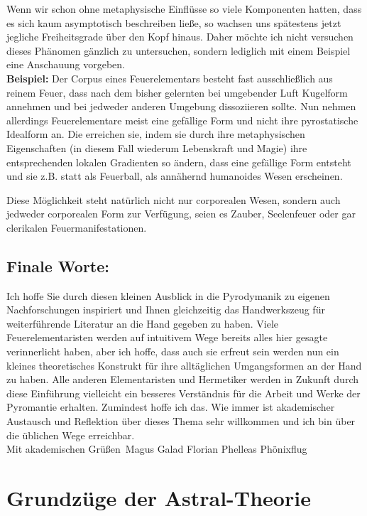 \documentclass[a5paper,8pt]{book}
\begin{document}
Wenn wir schon ohne metaphysische Einflüsse so viele Komponenten hatten, dass es sich kaum asymptotisch beschreiben ließe, 
so wachsen uns spätestens jetzt jegliche Freiheitsgrade über den Kopf hinaus. Daher möchte ich nicht versuchen dieses 
Phänomen gänzlich zu untersuchen, sondern lediglich mit einem Beispiel eine Anschauung vorgeben.\\

\textbf{Beispiel:}
Der Corpus eines Feuerelementars besteht fast ausschließlich aus reinem Feuer, dass nach dem bisher gelernten bei 
umgebender Luft Kugelform annehmen und bei jedweder anderen Umgebung dissoziieren sollte. Nun nehmen allerdings 
Feuerelementare meist eine gefällige Form und nicht ihre pyrostatische Idealform an. Die erreichen sie, indem sie durch 
ihre metaphysischen Eigenschaften (in diesem Fall wiederum Lebenskraft und Magie) ihre entsprechenden lokalen Gradienten 
so ändern, dass eine gefällige Form entsteht und sie z.B. statt als Feuerball, als annähernd humanoides Wesen erscheinen.

Diese Möglichkeit steht natürlich nicht nur corporealen Wesen, sondern auch jedweder corporealen Form zur Verfügung, seien 
es Zauber, Seelenfeuer oder gar clerikalen Feuermanifestationen.

\subsection{Finale Worte:}
Ich hoffe Sie durch diesen kleinen Ausblick in die Pyrodymanik zu eigenen Nachforschungen inspiriert und Ihnen gleichzeitig 
das Handwerkszeug für weiterführende Literatur an die Hand gegeben zu haben.
Viele Feuerelementaristen werden auf intuitivem Wege bereits alles hier gesagte verinnerlicht haben, aber ich hoffe, dass
auch sie erfreut sein werden nun ein kleines theoretisches Konstrukt für ihre alltäglichen Umgangsformen an der Hand zu 
haben.
Alle anderen Elementaristen und Hermetiker werden in Zukunft durch diese Einführung vielleicht ein besseres Verständnis 
für die Arbeit und Werke der Pyromantie erhalten.
Zumindest hoffe ich das.
Wie immer ist akademischer Austausch und Reflektion über dieses Thema sehr willkommen und ich bin über die üblichen Wege 
erreichbar.\\

Mit akademischen Grüßen\
Magus Galad Florian Phelleas Phönixflug

\newpage

\section{Grundzüge der Astral-Theorie}
\end{document}
